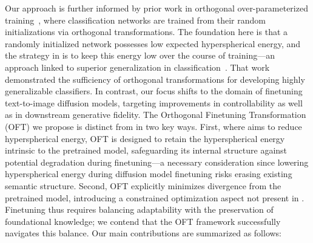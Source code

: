 Our approach is further informed by prior work in orthogonal over-parameterized training~\cite{liu2021orthogonal}, where classification networks are trained from their random initializations via orthogonal transformations. The foundation here is that a randomly initialized network possesses low expected hyperspherical energy, and the strategy in \cite{liu2021orthogonal} is to keep this energy low over the course of training—an approach linked to superior generalization in classification~\cite{liu2018learning,lin2020regularizing}. That work demonstrated the sufficiency of orthogonal transformations for developing highly generalizable classifiers. In contrast, our focus shifts to the domain of finetuning text-to-image diffusion models, targeting improvements in controllability as well as in downstream generative fidelity. The Orthogonal Finetuning Transformation (OFT) we propose is distinct from \cite{liu2021orthogonal} in two key ways. First, where \cite{liu2021orthogonal} aims to reduce hyperspherical energy, OFT is designed to retain the hyperspherical energy intrinsic to the pretrained model, safeguarding its internal structure against potential degradation during finetuning—a necessary consideration since lowering hyperspherical energy during diffusion model finetuning risks erasing existing semantic structure. Second, OFT explicitly minimizes divergence from the pretrained model, introducing a constrained optimization aspect not present in \cite{liu2021orthogonal}. Finetuning thus requires balancing adaptability with the preservation of foundational knowledge; we contend that the OFT framework successfully navigates this balance. Our main contributions are summarized as follows:


